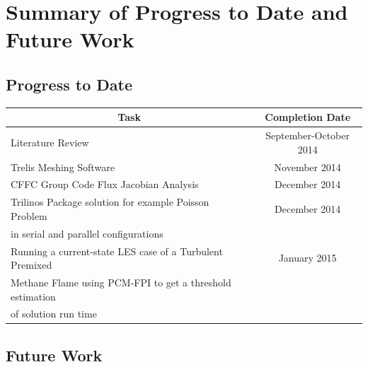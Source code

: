 \documentclass[titlepage,11pt,letterpaper]{article}
\begin{document}
\newpage
\section{Summary of Progress to Date and Future Work}

\subsection{Progress to Date}

\begin{tabular}{|l|c|} \hline
\multicolumn{1}{|c|}{\bf{Task}} & \multicolumn{1}{|c|}{\bf{Completion Date}} \\

\hline Literature Review & September-October 2014 \\

\hline Trelis Meshing Software & November 2014 \\

\hline CFFC Group Code Flux Jacobian Analysis & December 2014 \\

\hline Trilinos Package solution for example Poisson Problem & December 2014 \\in serial and parallel configurations & \\

\hline Running a current-state LES case of a Turbulent Premixed & January 2015 \\Methane Flame using PCM-FPI to get a threshold estimation & \\ of solution run time\\

\hline
\end{tabular}

\subsection{Future Work}
\end{document}
